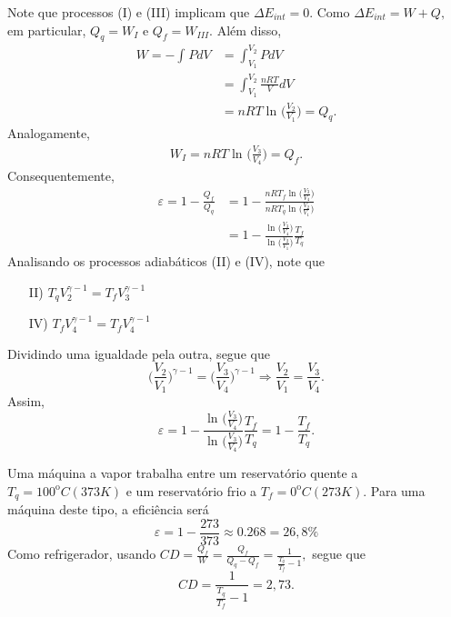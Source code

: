 \documentclass[PhysicsII/phsyicsII_notes.tex]{subfiles}
\begin{document}
Note que processos (I) e (III) implicam que \(\Delta E_{int} = 0.\) Como \(\Delta E_{int} = W + Q,\) em particular,
\(Q_{q} = W_{I}\) e \(Q_{f} = W_{III}.\) Além disso,
\begin{align*}
	W = - \int_{}^{}PdV & = \int_{V_{1}}^{V_{2}}PdV                                \\
	                    & = \int_{V_{1}}^{V_{2}}\frac{nRT}{V}dV                    \\
	                    & = nRT \ln^{}{\biggl(\frac{V_{2}}{V_{1}}\biggr)} = Q_{q}.
\end{align*}
Analogamente,
\begin{align*}
	W_{I} = nRT\ln^{}{\biggl(\frac{V_{3}}{V_{4}}\biggr)} = Q_{f}.
\end{align*}
Consequentemente,
\begin{align*}
	\varepsilon = 1 - \frac{Q_{f}}{Q_{q}} & = 1 - \frac{nRT_{f}\ln^{}{\biggl(\frac{V_{3}}{V_{4}}\biggr)}}{nRT_{q}\ln^{}{\biggl(\frac{V_{2}}{V_{1}}\biggr)}}      \\
	                                      & = 1 - \frac{\ln^{}{\biggl(\frac{V_{3}}{V_{4}}\biggr)}}{\ln^{}{\biggl(\frac{V_{2}}{V_{1}}\biggr)}}\frac{T_{f}}{T_{q}}
\end{align*}
Analisando os processos adiabáticos (II) e (IV), note que
\begin{itemize}
	\item[II)] \(T_{q}V_{2}^{\gamma -1} = T_{f}V_{3}^{\gamma -1}\)
	\item[IV)] \(T_{f}V_{4}^{\gamma -1} = T_{f}V_{4}^{\gamma -1}\)
\end{itemize}
Dividindo uma igualdade pela outra, segue que
\[
	\biggl(\frac{V_{2}}{V_{1}}\biggr)^{\gamma -1} = \biggl(\frac{V_{3}}{V_{4}}\biggr)^{\gamma -1} \Rightarrow \frac{V_{2}}{V_{1}} = \frac{V_{3}}{V_{4}}.
\]
Assim,
\[
	\varepsilon  = 1 - \frac{\ln^{}{\biggl(\frac{V_{3}}{V_{4}}\biggr)}}{\ln^{}{\biggl(\frac{V_{3}}{V_{4}}\biggr)}}\frac{T_{f}}{T_{q}} = 1 - \frac{T_{f}}{T_{q}}.
\]
\begin{example}
	Uma máquina a vapor trabalha entre um reservatório quente a \(T_{q}={100}^{\mathrm{o}}C (373K)\) e um
	reservatório frio a \(T_{f}={0}^{\mathrm{o}}C (273K).\) Para uma máquina deste tipo, a eficiência será
	\[
		\varepsilon  = 1 - \frac{273}{373}\approx 0.268 = 26,8\%
	\]
	Como refrigerador, usando \(CD = \frac{Q_{f}}{W} = \frac{Q_{f}}{Q_{q}-Q_{f}} = \frac{1}{\frac{T_{q}}{T_{f}}-1},\) segue que
	\[
		CD = \frac{1}{\frac{T_{q}}{T_{f}}-1} = 2,73.
	\]
\end{example}
\end{document}
